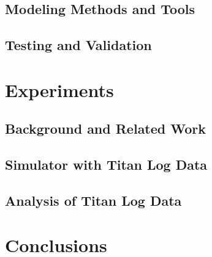 \documentclass[twocolumn]{svjour3}           %
\begin{document}
\subsection{Modeling Methods and Tools}
\label{sec-strategy-2}


\subsection{Testing and Validation}
\label{sec-strategy-3}



\section{Experiments}
\label{sec-experiments}

\subsection{Background and Related Work}
\label{sec-experiments-1}


\subsection{Simulator with Titan Log Data}
\label{sec-experiments-2}


\subsection{Analysis of Titan Log Data}
\label{sec-experiments-3}



\section{Conclusions}
\label{sec-conclusions}



\begin{acknowledgements}

\end{acknowledgements}



\begin{thebibliography}{}

\end{thebibliography}

\clearpage
\appendix

\end{document}

